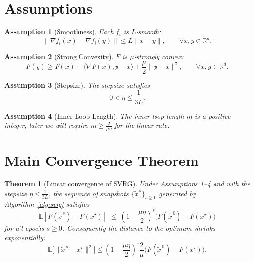 \documentclass[11pt]{article}
\newtheorem{theorem}{Theorem}
\newtheorem{assumption}{Assumption}
\newcommand{\E}{\mathbb{E}}
\newcommand{\R}{\mathbb{R}}
\begin{document}
\section*{Assumptions}
\begin{assumption}[Smoothness]\label{ass:smooth}
Each $f_i$ is $L$‑smooth:
\[
\|\nabla f_i(x)-\nabla f_i(y)\|\le L\|x-y\|,\qquad\forall x,y\in\R^{d}.
\]
\end{assumption}
\begin{assumption}[Strong Convexity]\label{ass:strong}
$F$ is $\mu$‑strongly convex:
\[
F(y)\ge F(x)+\langle\nabla F(x),y-x\rangle+\frac{\mu}{2}\|y-x\|^{2},
\qquad\forall x,y\in\R^{d}.
\]
\end{assumption}
\begin{assumption}[Stepsize]\label{ass:stepsize}
The stepsize satisfies
\[
0<\eta\le \frac{1}{3L}.
\]
\end{assumption}
\begin{assumption}[Inner Loop Length]\label{ass:inner}
The inner loop length $m$ is a positive integer; later we will require $m\ge \frac{2}{\mu\eta}$ for the linear rate.
\end{assumption}

\section*{Main Convergence Theorem}
\begin{theorem}[Linear convergence of SVRG]\label{thm:linear}
Under Assumptions \ref{ass:smooth}–\ref{ass:inner} and with the stepsize $\eta\le\frac{1}{3L}$,
the sequence of snapshots $\{\tilde{x}^{\,s}\}_{s\ge0}$ generated by Algorithm~\ref{alg:svrg}
satisfies
\[
\boxed{
\E\!\left[F(\tilde{x}^{\,s})-F(x^\star)\right]\;\le\;
\left(1-\frac{\mu\eta}{2}\right)^{s}
\bigl(F(\tilde{x}^{\,0})-F(x^\star)\bigr)
}\tag{5}
\]
for all epochs $s\ge0$. Consequently the distance to the optimum shrinks exponentially:
\[
\E\!\bigl[\| \tilde{x}^{\,s}-x^\star\|^{2}\bigr]\le
\left(1-\frac{\mu\eta}{2}\right)^{s}
\frac{2}{\mu}\bigl(F(\tilde{x}^{\,0})-F(x^\star)\bigr).
\]
\end{theorem}

\end{document}

